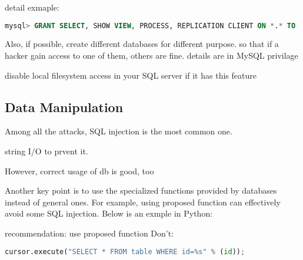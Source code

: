 \documentclass[conference]{IEEEtran}
\begin{document}
detail \cite{MySQL_privilage_detail}
exmaple:
\begin{lstlisting}[language=sql]
mysql> GRANT SELECT, SHOW VIEW, PROCESS, REPLICATION CLIENT ON *.* TO ...
\end{lstlisting}

Also, if possible, create different databases for different purpose.
so that if a hacker gain access to one of them, others are fine.
details are in MySQL privilage\cite{MySQL_privilage}



disable local filesystem access in your SQL server if it has this feature

\subsection{Data Manipulation} %
Among all the attacks, SQL injection is the most common one.

string I/O to prvent it.

However, correct usage of db is good, too

Another key point is to use the specialized functions provided by databases
instead of general ones. For example, using proposed function can effectively
avoid some SQL injection. Below is an exmple in Python:

recommendation:
use proposed function
Don't:
\begin{lstlisting}[language=python]
cursor.execute("SELECT * FROM table WHERE id=%s" % (id));
\end{lstlisting}
\end{document}

